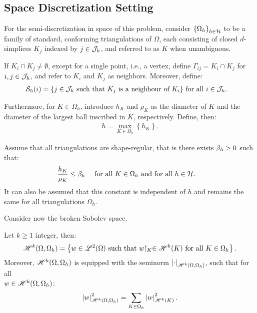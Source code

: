 \subsection{Space Discretization Setting}

For the semi-discretization in space of this problem, consider $\left\{ \Omega_{h} \right\}_{h \in \mathcal{H}}$ to be a family of standard, conforming triangulations of $\Omega$, each consisting of closed $d$-simplices $K_j$ indexed by $j \in \mathcal{J}_h$, and referred to as $K$ when unambiguous. %

If $K_i \cap K_j \neq \emptyset$, except for a single point, i.e., a vertex, define $\Gamma_{ij} = K_i \cap K_j$ for $i, j \in \mathcal{J}_h$, and refer to $K_i$ and $K_j$ as neighbors. Moreover, define:
\begin{align}
    \mathcal{S}_h(i) = \left\{ j \in \mathcal{J}_h \text{ such that } K_j \text{ is a neighbour of } K_i \right\} &\text{ for all } i \in \mathcal{J}_h.
\end{align}

Furthermore, for $K \in \Omega_h$, introduce $h_K$ and $\rho_K$ as the diameter of $K$ and the diameter of the largest ball inscribed in $K$, respectively. Define, then:
\begin{align}
    h = \max_{K \in \Omega_h} \left\{ h_K \right\}.
\end{align}

Assume that all triangulations are shape-regular, that is there exists $\beta_{h} > 0$ such that:
\begin{align}
    \frac{h_K}{\rho_K} &\leq \beta_{h} &\text{ for all } K \in \Omega_h &\text{ and for all } h \in \mathcal{H}.
\end{align}
It can also be assumed that this constant is independent of $h$ and remains the same for all triangulations $\Omega_h$.

Consider now the broken Sobolev space.
\begin{definition} %
    Let $k \geq 1$ integer, then:
    \begin{align}
        \mathscr{H}^{k}(\Omega, \Omega_h) = \left\{ w \in \mathscr{L}^{2}(\Omega) \text{ such that } w \!\!\restriction_{K} \in \mathscr{H}^{k}(K) \text{ for all } K \in \Omega_h \right\}.
    \end{align}
    Moreover, $\mathscr{H}^{k}(\Omega, \Omega_h)$ is equipped with the seminorm $\left\lvert \cdot \right\rvert_{\mathscr{H}^{k}(\Omega, \Omega_h)}$, such that for all \\ $w \in \mathscr{H}^{k}(\Omega, \Omega_h)$:
    \begin{align}
        \left\lvert w \right\rvert_{\mathscr{H}^{k}(\Omega, \Omega_h)}^2 = \sum_{K \in \Omega_h} \left\lvert w \right\rvert_{\mathscr{H}^{k}(K)}^2.
    \end{align}
\end{definition}


